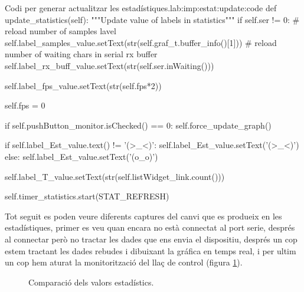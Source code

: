 \begin{code_python}{Codi per generar actualitzar les estadístiques.}{lab:imp:estat:update:code}
def update_statistics(self):
    """Update value of labels in statistics"""
    if self.ser != 0:
        # reload number of samples lavel
        self.label_samples_value.setText(str(self.graf_t.buffer_info()[1]))
        # reload number of waiting chars in serial rx buffer
        self.label_rx_buff_value.setText(str(self.ser.inWaiting()))
        
        self.label_fps_value.setText(str(self.fps*2))
        
        self.fps = 0
        
        if self.pushButton_monitor.isChecked() == 0:
            self.force_update_graph()
            
        if self.label_Est_value.text() != '(>_<)':
            self.label_Est_value.setText('(>_<)')
        else:
            self.label_Est_value.setText('(o_o)')
        
        self.label_T_value.setText(str(self.listWidget_link.count()))
        
        self.timer_statistics.start(STAT_REFRESH)
\end{code_python}

Tot seguit es poden veure diferents captures del canvi que es produeix en les estadístiques, primer es veu quan encara no està connectat al port serie, després al connectar però no tractar les dades que ens envia el dispositiu, després un cop estem tractant les dades rebudes i dibuixant la gráfica en temps real, i per ultim un cop hem aturat la monitorització del llaç de control (figura \ref{fig:comparacio_estadistiques}).

\begin{figure}[ht!]
	\caption{Comparació dels valors estadístics.}
    \label{fig:comparacio_estadistiques}
\end{figure}

\FloatBarrier

